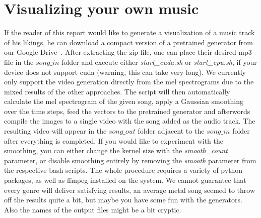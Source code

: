         \section{Visualizing your own music}
            If the reader of this report would like to generate a visualization of a music track of his likings, he can download a compact version of a pretrained generator from our Google Drive~\cite{visualizer}. After extracting the zip file, one can place their desired mp3 file in the $song\_in$ folder and execute either \textit{start\_cuda.sh} or \textit{start\_cpu.sh}, if your device does not support cuda (warning, this can take very long). We currently only support the video generation directly from the mel spectrograms due to the mixed results of the other approaches. The script will then automatically calculate the mel spectrogram of the given song, apply a Gaussian smoothing over the time steps, feed the vectors to the pretrained generator and afterwords compile the images to a single video with the song added as the audio track. The resulting video will appear in the $song\_out$ folder adjacent to the $song\_in$ folder after everything is completed. If you would like to experiment with the smoothing, you can either change the kernel size with the \textit{smooth\_count} parameter, or disable smoothing entirely by removing the \textit{smooth} parameter from the respective bash scripts. The whole procedure requires a variety of python packages, as well as ffmpeg installed on the system. We cannot guarantee that every genre will deliver satisfying results, an average metal song seemed to throw off the results quite a bit, but maybe you have some fun with the generators. Also the names of the output files might be a bit cryptic.